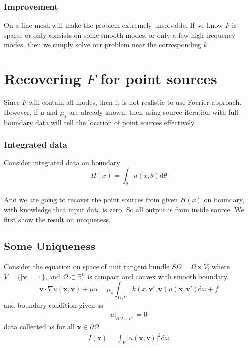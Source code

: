 \documentclass[12pt,a4paper]{article}
\begin{document}
\subsubsection{Improvement}
On a fine mesh will make the problem extremely unsolvable. If we know $F$ is sparse or only consists on some smooth modes, or only a few high frequency modes, then we simply solve our problem near the corresponding $k$.
\section{Recovering $F$ for point sources}
Since $F$ will contain all modes, then it is not realistic to use Fourier approach. However, if $\mu$ and $\mu_s$ are already known, then using source iteration with full boundary data will tell the location of point sources effectively.
\subsubsection{Integrated data}
Consider integrated data on boundary $$H(x) = \int_{\theta} u(x,\theta) \mathrm{d}\theta$$\\
And we are going to recover the point sources from given $H(x)$ on boundary, with knowledge that input data is zero. So all output is from inside source. We first show the result on uniqueness.
\subsection{Some Uniqueness}
Consider the equation on space of unit tangent bundle $S\Omega = \Omega \times V$, where $V = \{|\mathbf{v}| = 1\}$, and $\Omega\subset \mathbb{R}^n$ is compact and convex with smooth boundary.
\begin{equation}
\mathbf{v}\cdot \nabla u(\mathbf{x},\mathbf{v}) + \mu u = \mu_s \int_{\Omega_xV} k(x,\mathbf{v'},\mathbf{v})u(\mathbf{x},\mathbf{v'})\mathrm{d}\omega + f
\end{equation}
and boundary condition given as
\begin{eqnarray}
u |_{\partial\Omega\times V^{-}} = 0
\end{eqnarray}
data collected as for all $\mathbf{x}\in \partial \Omega$
\begin{eqnarray}
I(\mathbf{x}) = \int_{V} |u (\mathbf{x},\mathbf{v})|^2\mathrm{d}\omega 
\end{eqnarray}
\end{document}
